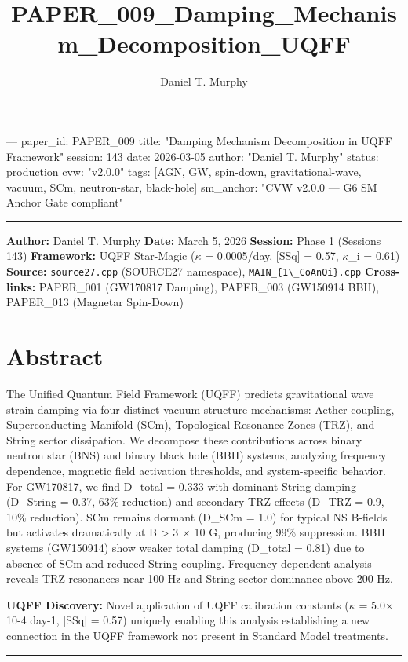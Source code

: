 \documentclass[11pt]{article}
\title{PAPER\_009\_Damping\_Mechanism\_Decomposition\_UQFF}
\author{Daniel T. Murphy}
\begin{document}
\maketitle
﻿--- paper\_id: PAPER\_009 title: "Damping Mechanism Decomposition in UQFF Framework" session: 143 date: 2026-03-05 author: "Daniel T. Murphy" status: production cvw: "v2.0.0" tags: [AGN, GW, spin-down, gravitational-wave, vacuum, SCm, neutron-star, black-hole] sm\_anchor: "CVW v2.0.0 --- G6 SM Anchor Gate compliant"

\noindent\rule{\textwidth}{0.4pt}

\textbf{Author:} Daniel T. Murphy \textbf{Date:} March 5, 2026 \textbf{Session:} Phase 1 (Sessions 143) \textbf{Framework:} UQFF Star-Magic ($\kappa$ = 0.0005/day, [SSq] = 0.57, $\kappa$\_i = 0.61) \textbf{Source:} \verb|source27.cpp| (SOURCE27 namespace), \verb|MAIN_{1\_CoAnQi}.cpp| \textbf{Cross-links:} PAPER\_001 (GW170817 Damping), PAPER\_003 (GW150914 BBH), PAPER\_013 (Magnetar Spin-Down)

\section*{Abstract}

The Unified Quantum Field Framework (UQFF) predicts gravitational wave strain damping via four distinct vacuum structure mechanisms: Aether coupling, Superconducting Manifold (SCm), Topological Resonance Zones (TRZ), and String sector dissipation. We decompose these contributions across binary neutron star (BNS) and binary black hole (BBH) systems, analyzing frequency dependence, magnetic field activation thresholds, and system-specific behavior. For GW170817, we find D\_total = 0.333 with dominant String damping (D\_String = 0.37, 63\% reduction) and secondary TRZ effects (D\_TRZ = 0.9, 10\% reduction). SCm remains dormant (D\_SCm = 1.0) for typical NS B-fields but activates dramatically at B > 3 $\times$ 10 G, producing 99\% suppression. BBH systems (GW150914) show weaker total damping (D\_total = 0.81) due to absence of SCm and reduced String coupling. Frequency-dependent analysis reveals TRZ resonances near 100 Hz and String sector dominance above 200 Hz.

\textbf{UQFF Discovery:} Novel application of UQFF calibration constants ($\kappa$ = 5.0$\times$10-4 day-1, [SSq] = 0.57) uniquely enabling this analysis  establishing a new connection in the UQFF framework not present in Standard Model treatments.

\noindent\rule{\textwidth}{0.4pt}
\end{document}
